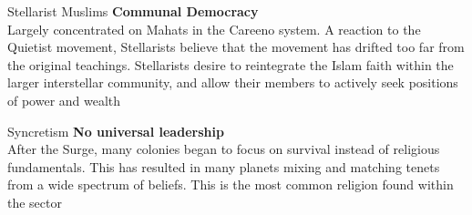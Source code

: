\begin{multicols}{2}
\begin{genericsection}{Stellarist Muslims}
\textbf{Communal Democracy}\\
Largely concentrated on Mahats in the Careeno system. A reaction to the Quietist movement, Stellarists believe that the movement has drifted too far from the original teachings. Stellarists desire to reintegrate the Islam faith within the larger interstellar community, and allow their members to actively seek positions of power and wealth
\end{genericsection}

\begin{genericsection}{Syncretism}
\textbf{No universal leadership}\\
After the Surge, many colonies began to focus on survival instead of religious fundamentals. This has resulted in many planets mixing and matching tenets from a wide spectrum of beliefs. This is the most common religion found within the sector
\end{genericsection}

\end{multicols}
